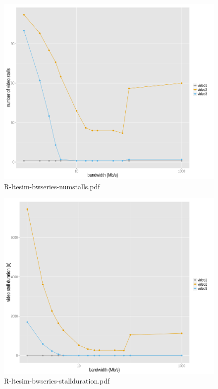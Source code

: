 \begin{figure}[htb]
\centering
\includegraphics[width=1.0\textwidth]{images/R-ltesim-bwseries-numstalls.pdf}
\caption{R-ltesim-bwseries-numstalls.pdf}
\label{c5:fig:ltesim-bwseries-numstalls}
\end{figure}

\begin{figure}[htb]
\centering
\includegraphics[width=1.0\textwidth]{images/R-ltesim-bwseries-stallduration.pdf}
\caption{R-ltesim-bwseries-stallduration.pdf}
\label{c5:fig:ltesim-bwseries-stallduration}
\end{figure}

